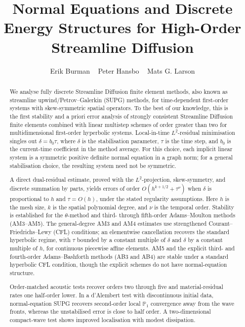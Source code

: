 \documentclass[11pt]{article}
\title{Normal Equations and Discrete Energy Structures for
High-Order Streamline Diffusion}
\author{
Erik Burman \mbox{  }
Peter Hansbo \mbox{  }
Mats G. Larson
}
\date{ }
\begin{document}
\maketitle

\begin{abstract}
We analyse fully discrete Streamline Diffusion finite element methods, also
known as streamline upwind/Petrov--Galerkin (SUPG) methods, for time-dependent
first-order systems with skew-symmetric spatial operators.
To the best of our knowledge, this is the first stability and a
priori error analysis of strongly consistent Streamline Diffusion finite
elements combined with linear multistep schemes of order greater than two for
multidimensional first-order hyperbolic systems.
Local-in-time \(L^2\)-residual minimisation singles out
\(\delta=b_0\tau\), where \(\delta\) is the stabilisation parameter,
\(\tau\) is the time step, and \(b_0\) is the current-time coefficient in the
method average. For this choice, each implicit linear system is a symmetric
positive definite normal equation in a graph norm; for a general
stabilisation choice, the resulting system need not be symmetric.

A direct dual-residual estimate, proved with the \(L^2\)-projection,
skew-symmetry, and discrete summation by parts, yields errors of order
\(O(h^{k+1/2}+\tau^\nu)\) when \(\delta\) is proportional to \(h\) and
\(\tau=O(h)\), under the stated regularity assumptions. Here \(h\) is the mesh
size, \(k\) is the spatial polynomial degree, and \(\nu\) is the temporal order. Stability is
established for the \(\theta\)-method and third- through fifth-order
Adams--Moulton methods (AM3--AM5). The general-degree AM3 and AM4 estimates use
strengthened Courant--Friedrichs--Lewy (CFL) conditions; an elementwise
cancellation recovers the standard hyperbolic regime, with \(\tau\) bounded by
a constant multiple of \(\delta\) and \(\delta\) by a constant multiple of
\(h\), for continuous piecewise affine elements.
AM5 and the explicit third- and fourth-order Adams--Bashforth methods
(AB3 and AB4) are stable under a standard hyperbolic CFL condition, though the
explicit schemes do not have normal-equation structure.

Order-matched acoustic tests recover orders two through five and
material-residual rates one half-order lower. In a d'Alembert test with
discontinuous initial data, normal-equation SUPG recovers second-order local
\(\mathbb P_1\)
convergence away from the wave fronts, whereas the unstabilised error is close
to half order. A two-dimensional compact-wave test shows improved localisation
with modest dissipation.
\end{abstract}
\end{document}
